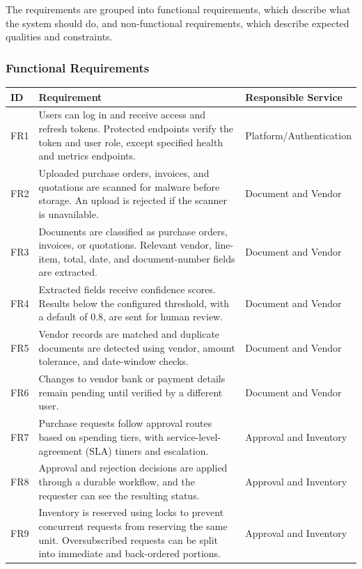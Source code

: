 \documentclass[12pt,a4paper]{report}
\begin{document}
The requirements are grouped into functional requirements, which
describe what the system should do, and non-functional requirements,
which describe expected qualities and constraints.

\subsubsection{Functional Requirements}

\begin{longtable}{|p{0.8in}|p{3.8in}|p{1.5in}|}
\hline
\textbf{ID} & \textbf{Requirement} & \textbf{Responsible Service} \\
\hline
FR1 & Users can log in and receive access and refresh tokens. Protected
endpoints verify the token and user role, except specified health and
metrics endpoints. & Platform/Authentication \\
\hline
FR2 & Uploaded purchase orders, invoices, and quotations are scanned
for malware before storage. An upload is rejected if the scanner is
unavailable. & Document and Vendor \\
\hline
FR3 & Documents are classified as purchase orders, invoices, or
quotations. Relevant vendor, line-item, total, date, and document-number
fields are extracted. & Document and Vendor \\
\hline
FR4 & Extracted fields receive confidence scores. Results below the
configured threshold, with a default of 0.8, are sent for human review.
& Document and Vendor \\
\hline
FR5 & Vendor records are matched and duplicate documents are detected
using vendor, amount tolerance, and date-window checks.
& Document and Vendor \\
\hline
FR6 & Changes to vendor bank or payment details remain pending until
verified by a different user. & Document and Vendor \\
\hline
FR7 & Purchase requests follow approval routes based on spending tiers,
with service-level-agreement (SLA) timers and escalation.
& Approval and Inventory \\
\hline
FR8 & Approval and rejection decisions are applied through a durable
workflow, and the requester can see the resulting status.
& Approval and Inventory \\
\hline
FR9 & Inventory is reserved using locks to prevent concurrent requests
from reserving the same unit. Oversubscribed requests can be split into
immediate and back-ordered portions. & Approval and Inventory \\

\end{longtable}
\end{document}
